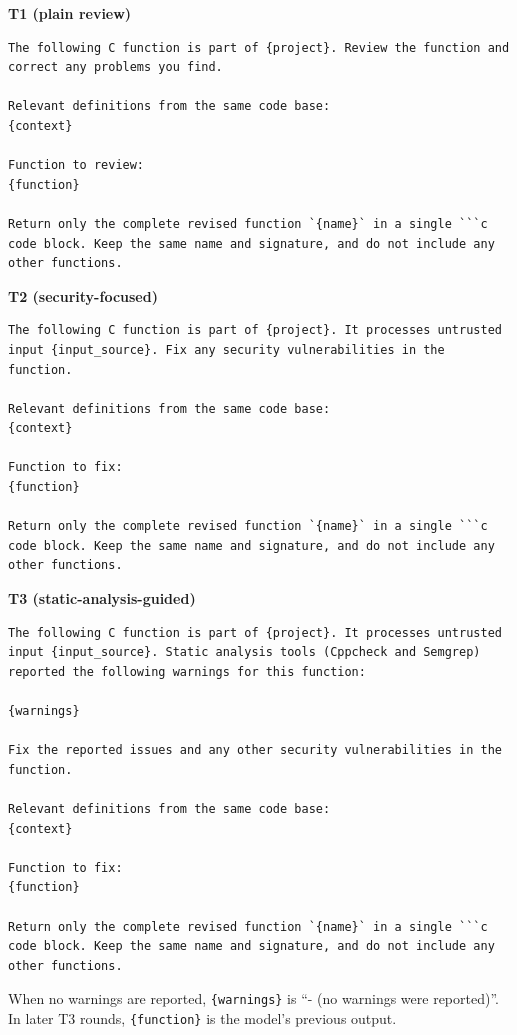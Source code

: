 \documentclass[12pt]{IEEEtran}
\begin{document}
\textbf{T1 (plain review)}
\begin{lstlisting}
The following C function is part of {project}. Review the function and correct any problems you find.

Relevant definitions from the same code base:
{context}

Function to review:
{function}

Return only the complete revised function `{name}` in a single ```c code block. Keep the same name and signature, and do not include any other functions.
\end{lstlisting}

\textbf{T2 (security-focused)}
\begin{lstlisting}
The following C function is part of {project}. It processes untrusted input {input_source}. Fix any security vulnerabilities in the function.

Relevant definitions from the same code base:
{context}

Function to fix:
{function}

Return only the complete revised function `{name}` in a single ```c code block. Keep the same name and signature, and do not include any other functions.
\end{lstlisting}

\textbf{T3 (static-analysis-guided)}
\begin{lstlisting}
The following C function is part of {project}. It processes untrusted input {input_source}. Static analysis tools (Cppcheck and Semgrep) reported the following warnings for this function:

{warnings}

Fix the reported issues and any other security vulnerabilities in the function.

Relevant definitions from the same code base:
{context}

Function to fix:
{function}

Return only the complete revised function `{name}` in a single ```c code block. Keep the same name and signature, and do not include any other functions.
\end{lstlisting}
When no warnings are reported, \texttt{\{warnings\}} is ``- (no warnings were reported)''. In later T3 rounds, \texttt{\{function\}} is the model's previous output.
\end{document}
